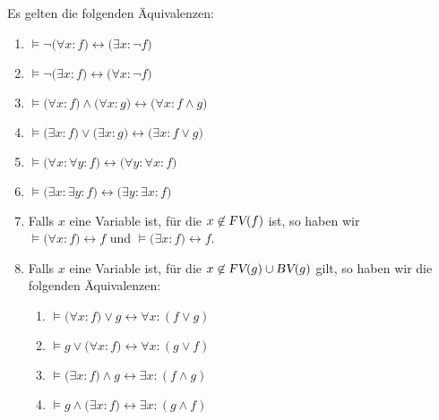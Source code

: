 \begin{Satz}
  Es gelten die folgenden \"{A}quivalenzen:
  \begin{enumerate}
  \item $\models \neg\big(\forall x\colon f\big) \leftrightarrow \big(\exists x\colon \neg f\big)$
  \item $\models \neg\big(\exists x\colon f\big) \leftrightarrow \big(\forall x\colon \neg f\big)$
  \item $\models \big(\forall x\colon f\big) \wedge \big(\forall x\colon g\big) \leftrightarrow \big(\forall x\colon f \wedge g\big)$
  \item $\models \big(\exists x\colon f\big) \vee \big(\exists x\colon g\big) \leftrightarrow \big(\exists x\colon f \vee g\big)$
  \item $\models \big(\forall x\colon \forall y\colon f \big) \leftrightarrow \big(\forall y\colon  \forall x\colon f \big)$
  \item $\models \big(\exists x\colon \exists y\colon f \big) \leftrightarrow \big(\exists y\colon  \exists x\colon f \big)$
  \item Falls $x$ eine Variable ist, f\"{u}r die $x \not\in \textsl{FV}(f)$ ist, so haben wir \\[0.2cm]
        \hspace*{1.3cm} $\models  \big(\forall x\colon f) \leftrightarrow f$ \quad und \quad
                        $\models  \big(\exists x\colon f) \leftrightarrow f$.
  \item Falls $x$ eine Variable ist, f\"{u}r die  $x \not\in \textsl{FV}(g) \cup \textsl{BV}(g)$ gilt, so haben wir die folgenden \"{A}quivalenzen:
    \begin{enumerate}
    \item $\models \big(\forall x\colon f) \vee g \leftrightarrow \forall x\colon (f \vee g)$
    \item $\models g \vee \big(\forall x\colon f) \leftrightarrow \forall x\colon (g \vee f)$
    \item $\models \big(\exists x\colon f) \wedge g \leftrightarrow \exists x\colon (f \wedge g)$
    \item $\models g \wedge \big(\exists x\colon f) \leftrightarrow \exists x\colon (g \wedge f)$
    \end{enumerate}
  \end{enumerate}
\end{Satz}


